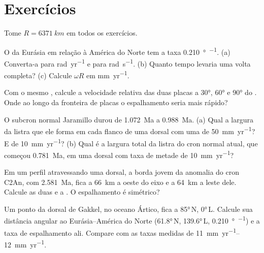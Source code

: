 \section{Exercícios}

Tome $R = \qty{6371}{km}$ em todos os exercícios.

\begin{exercise}[$\star$]\label{exo:b1:plate-kinematics:1}
O  da Eurásia em relação à América do Norte tem a taxa
\qty{0.210}{\degree\per\Myr}. (a) Converta-a para \unit{rad.yr^{-1}} e para
\unit{rad.s^{-1}}. (b) Quanto tempo levaria uma volta completa? (c) Calcule $\omega R$ em
\unit{mm.yr^{-1}}.
\end{exercise}

\begin{exercise}[$\star$]\label{exo:b1:plate-kinematics:2}
Com o mesmo , calcule a velocidade relativa das duas placas a
\ang{30}, \ang{60} e \ang{90} do . Onde ao longo da fronteira
de placas o espalhamento seria mais rápido?
\end{exercise}

\begin{exercise}[$\star$]\label{exo:b1:plate-kinematics:3}
O subcron normal Jaramillo durou de \qty{1.072}{Ma} a \qty{0.988}{Ma}.
(a) Qual a largura da listra que ele forma em cada flanco de uma dorsal com uma
 de \qty{50}{mm.yr^{-1}}? E de \qty{10}{mm.yr^{-1}}? (b) Qual é a
largura total da listra do cron normal atual, que começou
\qty{0.781}{Ma}, em uma dorsal com taxa de metade de \qty{10}{mm.yr^{-1}}?
\end{exercise}

\begin{exercise}[$\star$]\label{exo:b1:plate-kinematics:4}
Em um perfil atravessando uma dorsal, a borda jovem da anomalia do cron C2An,
com \qty{2.581}{Ma}, fica a \qty{66}{km} a oeste do eixo e a \qty{64}{km} a leste
dele. Calcule as duas  e a . O
espalhamento é simétrico?
\end{exercise}

\begin{exercise}[$\star\star$]\label{exo:b1:plate-kinematics:5}
Um ponto da dorsal de Gakkel, no oceano Ártico, fica a \ang{85}\,N, \ang{0}\,L.
Calcule sua distância angular ao  Eurásia--América do Norte
(\ang{61.8}\,N, \ang{139.6}\,L, \qty{0.210}{\degree\per\Myr}) e a taxa de espalhamento
ali. Compare com as taxas medidas de \qtyrange{11}{12}{mm.yr^{-1}}.
\end{exercise}

